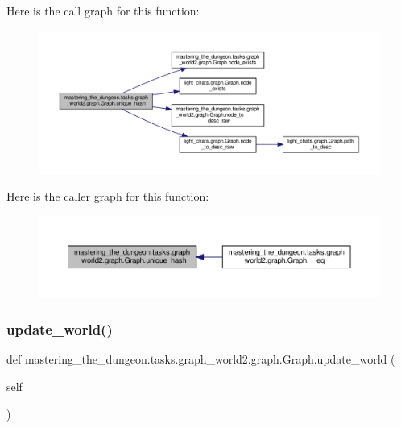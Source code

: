 Here is the call graph for this function\+:
\nopagebreak
\begin{figure}[H]
\begin{center}
\leavevmode
\includegraphics[width=350pt]{classmastering__the__dungeon_1_1tasks_1_1graph__world2_1_1graph_1_1Graph_a8a04e4cf35e5e0e502c1b529683b82f6_cgraph}
\end{center}
\end{figure}
Here is the caller graph for this function\+:
\nopagebreak
\begin{figure}[H]
\begin{center}
\leavevmode
\includegraphics[width=350pt]{classmastering__the__dungeon_1_1tasks_1_1graph__world2_1_1graph_1_1Graph_a8a04e4cf35e5e0e502c1b529683b82f6_icgraph}
\end{center}
\end{figure}
\mbox{\label{classmastering__the__dungeon_1_1tasks_1_1graph__world2_1_1graph_1_1Graph_a062ee34ffc89612a75b281a024f74c55}} 
\subsubsection{\texorpdfstring{update\+\_\+world()}{update\_world()}}
{\footnotesize\ttfamily def mastering\+\_\+the\+\_\+dungeon.\+tasks.\+graph\+\_\+world2.\+graph.\+Graph.\+update\+\_\+world (\begin{DoxyParamCaption}\item[{}]{self }\end{DoxyParamCaption})}



